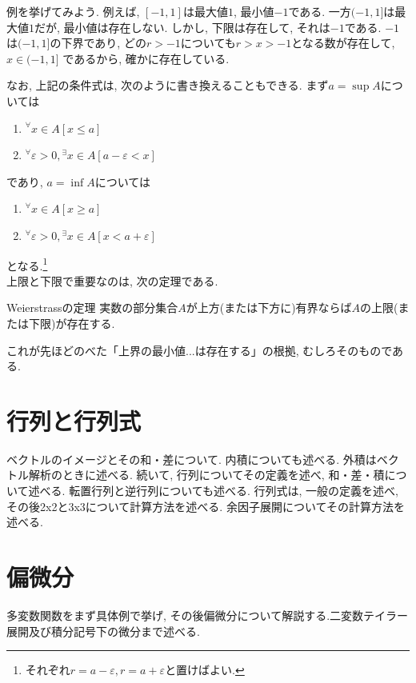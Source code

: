 \documentclass[a4j,dvipdfmx]{jsarticle}
\numberwithin{equation}{section}
\begin{document}
            例を挙げてみよう. 例えば, $[-1,1]$は最大値$1$, 最小値$-1$である. 一方$(-1,1]$は最大値$1$だが, 最小値は存在しない.
            しかし, 下限は存在して, それは$-1$である. $-1$は$(-1,1]$の下界であり, どの$r>-1$についても$r>x>-1$となる数が存在して, $x\in (-1,1]$
            であるから, 確かに存在している.

            なお, 上記の条件式は, 次のように書き換えることもできる. まず$a=\sup A$については
            \begin{enumerate}
                \item $^\forall x\in A \left[x\leq a\right]$
                \item $^\forall \varepsilon>0,{}^\exists x\in A \left[a-\varepsilon < x\right]$
            \end{enumerate}
            であり, $a=\inf A$については
            \begin{enumerate}
                \item $^\forall x\in A \left[x\geq a\right]$
                \item $^\forall \varepsilon>0,{}^\exists x\in A \left[x < a+\varepsilon\right]$
            \end{enumerate}
            となる.\footnote{それぞれ$r=a-\varepsilon,r=a+\varepsilon$と置けばよい.}\\

            上限と下限で重要なのは, 次の定理である. 
            \begin{itembox}{Weierstrassの定理}
                実数の部分集合$A$が上方(または下方に)有界ならば$A$の上限(または下限)が存在する.
            \end{itembox}
            これが先ほどのべた「上界の最小値...は存在する」の根拠, むしろそのものである.
    \clearpage
    \section{行列と行列式}
        ベクトルのイメージとその和・差について. 内積についても述べる. 外積はベクトル解析のときに述べる. 続いて, 行列についてその定義を述べ, 和・差・積について述べる.
        転置行列と逆行列についても述べる. 行列式は, 一般の定義を述べ, その後2x2と3x3について計算方法を述べる. 余因子展開についてその計算方法を述べる.
    \clearpage
    \section{偏微分}
        多変数関数をまず具体例で挙げ, その後偏微分について解説する.二変数テイラー展開及び積分記号下の微分まで述べる.
    \clearpage
\end{document}
